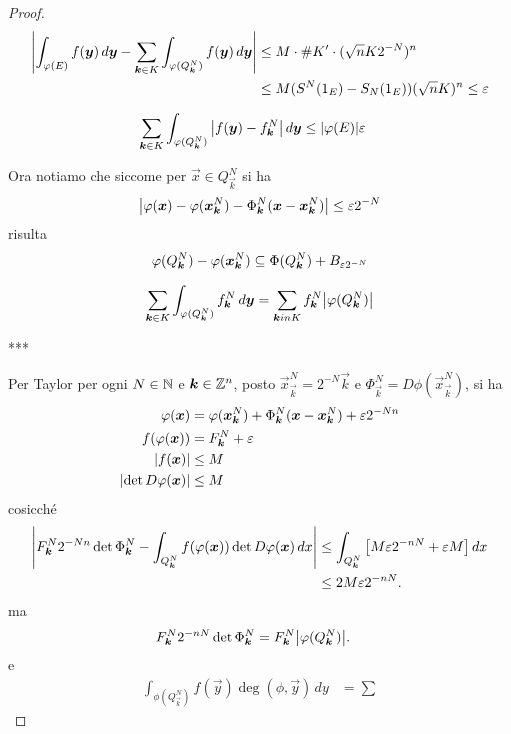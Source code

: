 \begin{proof}
\begin{align*}
  {\left|\int_{\varphi(E)} f(\boldsymbol y)\, d\boldsymbol y 
  - \sum_{\boldsymbol k \in K} \int_{\varphi(Q^N_{\boldsymbol k})} f(\boldsymbol y)\, d\boldsymbol y\right|}
  &\le M \cdot \#K' \cdot (\sqrt n K 2^{-N})^n \\
  &\le M (S^N(1_E)-S_N(1_E)) (\sqrt n K)^n
  \le \varepsilon 
\end{align*}

\begin{align*}
\sum_{\boldsymbol k \in K}\int_{\varphi(Q^N_{\boldsymbol k})} {\left|f(\boldsymbol y) - f^N_{\boldsymbol k}\right|}\, d\boldsymbol y
&\le  {\left|\varphi(E)\right|} \varepsilon 
\end{align*}

Ora notiamo che siccome per $\vec x \in Q^N_{\vec k}$ si ha 
\[
  {\left|
    \varphi(\boldsymbol x) - \varphi(\boldsymbol x^N_{\boldsymbol k}) 
    - \Phi^N_{\boldsymbol k}(\boldsymbol x - \boldsymbol x^N_{\boldsymbol k})\right|} \le \varepsilon 2^{-N}
\]
risulta 
\begin{align*}
 \varphi(Q^N_{\boldsymbol k}) - \varphi(\boldsymbol x^N_{\boldsymbol k}) \subseteq \Phi(Q^N_{\boldsymbol k})+B_{\varepsilon 2^{-N}}
\end{align*}

\begin{align*}
\sum_{\boldsymbol k \in K}
  \int_{\varphi(Q^N_{\boldsymbol k})} f^N_{\boldsymbol k}\, d\boldsymbol y 
= \sum_{\boldsymbol k in K} f^N_{\boldsymbol k} {\left|\varphi(Q^N_{\boldsymbol k})\right|}
\end{align*}

***

Per Taylor per ogni $N\in {\mathbb N}$ e $\boldsymbol k\in {\mathbb Z}^n$,
posto ${\vec x}^N_{\vec k} = 2^{-N}\vec k$ e $\Phi^N_{\vec k}=D\phi({\vec x}^N_{\vec k})$,
si ha 
\begin{align*}
  \varphi(\boldsymbol x) &= \varphi({\boldsymbol x}^N_{\boldsymbol k}) + \Phi^N_{\boldsymbol k} (\boldsymbol x - {\boldsymbol x}^N_{\boldsymbol k}) + \varepsilon 2^{-Nn}\\
  f(\varphi(\boldsymbol x)) &= F^N_{\boldsymbol k} + \varepsilon\\
  {\left|f(\boldsymbol x)\right|} & \le M\\
  {\left|\det D\varphi(\boldsymbol x)\right|} & \le M\\
\end{align*}
cosicché
\begin{align}
  {\left|
    F^N_{\boldsymbol k}  2^{-Nn} \det \Phi^N_{\boldsymbol k}
    - \int_{Q^N_{\boldsymbol k}} f(\varphi(\boldsymbol x)) \det D\varphi(\boldsymbol x)\, dx
  \right|}
  &\le \int_{Q^N_{\boldsymbol k}}  {\left[ M \varepsilon 2^{-nN} + \varepsilon M \right]}\, dx \\
  &\le 2M\varepsilon 2^{-nN}. 
\end{align}
ma 
\begin{align*}
    F^N_{\boldsymbol k} 2^{-nN} \det \Phi^N_{\boldsymbol k} 
    &= F^N_{\boldsymbol k}{\left|\varphi(Q^N_{\boldsymbol k})\right|}.
\end{align*}
e
\begin{align*}
  \int_{\phi(Q^N_{\vec k})} f(\vec y) \deg(\phi,\vec y)\, dy 
  &=
  \sum
\end{align*}
\end{proof}